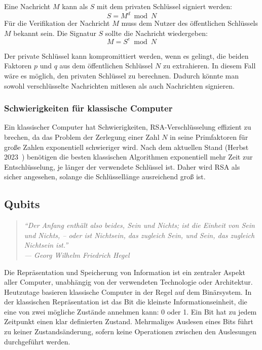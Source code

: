 Eine Nachricht \( M \) kann als \(S\) mit dem privaten Schlüssel signiert werden:
\[
  S = M^d \bmod N
\]
Für die Verifikation der Nachricht \(M\) muss dem Nutzer des öffentlichen Schlüssels \(M\) bekannt sein. 
Die Signatur \(S\) sollte die Nachricht wiedergeben:
\[
  M = S^e \bmod N
\]

Der private Schlüssel kann kompromittiert werden, wenn es gelingt, die beiden Faktoren \(p\) und 
\(q\) aus dem öffentlichen Schlüssel \(N\) zu extrahieren. 
In diesem Fall wäre es möglich, den privaten Schlüssel zu berechnen. 
Dadurch könnte man sowohl verschlüsselte Nachrichten mitlesen als auch Nachrichten signieren.

\subsubsection*{Schwierigkeiten für klassische Computer}
Ein klassischer Computer hat Schwierigkeiten, 
RSA-Verschlüsselung effizient zu brechen, 
da das Problem der Zerlegung einer Zahl \(N\) in seine Primfaktoren für große Zahlen exponentiell schwieriger wird. 
Nach dem aktuellen Stand (Herbst 2023~\cite{Hoever2022Krypto}) benötigen die besten klassischen Algorithmen exponentiell mehr Zeit zur Entschlüsselung, 
je länger der verwendete Schlüssel ist.
Daher wird RSA als sicher angesehen, solange die Schlüssellänge ausreichend groß ist.



\subsection{Qubits} 
\begin{quote}
  \noindent
  \textit{"`Der Anfang enthält also beides, Sein und
  Nichts; ist die Einheit von Sein und Nichts,
  -- oder ist Nichtsein, das zugleich Sein, und
  Sein, das zugleich Nichtsein ist."' \\
  --- Georg Wilhelm Friedrich Hegel}
\end{quote}

Die Repräsentation und Speicherung von Information ist ein zentraler Aspekt aller Computer, 
unabhängig von der verwendeten Technologie oder Architektur.
Heutzutage basieren klassische Computer in der Regel auf dem Binärsystem. 
In der klassischen Repräsentation ist das Bit die kleinste Informationseinheit, 
die eine von zwei mögliche Zustände annehmen kann: 0 oder 1. 
Ein Bit hat zu jedem Zeitpunkt einen klar definierten Zustand. 
Mehrmaliges Auslesen eines Bits führt zu keiner Zustandsänderung, 
sofern keine Operationen zwischen den Auslesungen durchgeführt werden.

